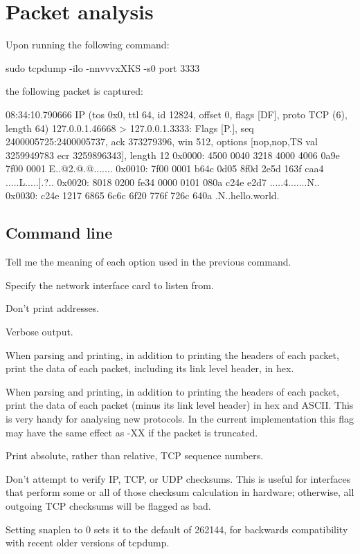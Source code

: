 \documentclass{swfulabreport}
\begin{document}
\maketitle %
\clearpage
\section{Packet analysis}

Upon running the following command:

\begin{shcode}
sudo tcpdump -ilo -nnvvvxXKS -s0 port 3333
\end{shcode}

the following packet is captured:

\begin{outputcode}
08:34:10.790666 IP (tos 0x0, ttl 64, id 12824, offset 0, flags [DF],
proto TCP (6), length 64)
  127.0.0.1.46668 > 127.0.0.1.3333: Flags [P.], seq 2400005725:2400005737,
ack 373279396,
  win 512, options [nop,nop,TS val 3259949783 ecr 3259896343], length 12
      0x0000:  4500 0040 3218 4000 4006 0a9e 7f00 0001  E..@2.@.@.......
      0x0010:  7f00 0001 b64c 0d05 8f0d 2e5d 163f caa4  .....L.....].?..
      0x0020:  8018 0200 fe34 0000 0101 080a c24e e2d7  .....4.......N..
      0x0030:  c24e 1217 6865 6c6c 6f20 776f 726c 640a  .N..hello.world.
\end{outputcode}

\subsection{Command line}

Tell me the meaning of each option used in the previous command.

\begin{description}[align=right,left=2cm,itemindent=-.5em]
\item[-i:] Specify the network interface card to listen from.
\item[-nn:] Don't print addresses.
\item[-vvv:] Verbose output.
\item[-x:] When parsing and printing, in addition to printing the
  headers of each packet, print the data of each packet, including its
  link level header, in hex.
\item[-X:] When parsing and printing, in addition to printing the
  headers of each packet, print the data of each packet (minus its
  link level header) in hex and ASCII.  This is very handy for
  analysing new protocols.  In the current implementation this flag
  may have the same effect as -XX if the packet is truncated.
\item[-S:] Print absolute, rather than relative, TCP sequence numbers.
\item[-K:] Don't attempt to verify IP, TCP, or UDP checksums.  This is
  useful for interfaces that perform some or all of those checksum
  calculation in hardware; otherwise, all outgoing TCP checksums
  will be flagged as bad.
\item[-s0:] Setting snaplen to 0 sets it to the default of 262144, for
  backwards compatibility with recent older versions of tcpdump.
\end{description}
\end{document}
